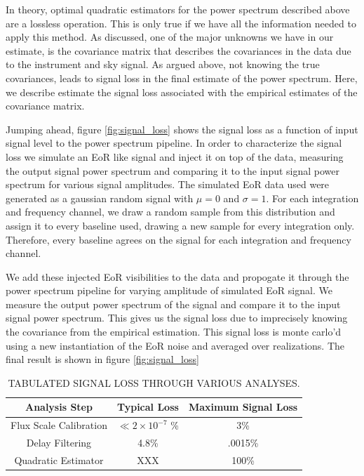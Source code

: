 \documentclass[twocolumn,numberedappendix]{emulateapj} \shorttitle{PSA64}
\begin{document}
In theory, optimal quadratic estimators for the power spectrum described above are a
lossless operation. This is only true if we have all the information
needed to apply this method. As discussed, one of the major unknowns we have in our
estimate, is the covariance matrix that describes the covariances in the data
due to the instrument and sky signal. As argued above, not knowing the true
covariances, leads to signal loss in the final estimate of the power spectrum.
Here, we describe estimate the signal loss associated with the empirical
estimates of the covariance matrix.

Jumping ahead, figure \ref{fig:signal_loss} shows the signal loss as a function
of input signal level to the power spectrum pipeline. In order to characterize
the signal loss we simulate an EoR like signal and inject it on top of the data,
measuring the output signal power spectrum and comparing it to the input signal
power spectrum for various signal amplitudes. The simulated EoR data used were
generated as a gaussian random signal with $\mu=0$ and $\sigma=1$. For each
integration and frequency channel, we draw a random sample from this
distribution and assign it to every baseline used, drawing a new sample for
every integration only. Therefore, every baseline agrees on the signal for each
integration and frequency channel. 

We add these injected EoR visibilities to the data and propogate it through the
power spectrum pipeline for varying amplitude of simulated EoR signal. We
measure the output power spectrum of the signal and
compare it to the input signal power spectrum. This gives us the signal loss
due to imprecisely knowing the covariance from the empirical estimation. This
signal loss is monte carlo'd using a new instantiation of the EoR noise and
averaged over realizations. The final result is shown in figure
\ref{fig:signal_loss}

\begin{table}[htdp]
\caption{TABULATED SIGNAL LOSS THROUGH VARIOUS ANALYSES.}
\begin{center}
\begin{tabular}{|c|c|c|}\hline
Analysis Step & Typical Loss & Maximum Signal Loss \\ \hline \hline
Flux Scale Calibration &  $\ll 2 \times 10^{-7}$ \% & 3\% \\\hline
Delay Filtering & 4.8\% & .0015\% \\\hline
Quadratic Estimator & XXX & 100\% \\\hline
\end{tabular}
\end{center}
\label{tbl:sigloss}
\end{table}%
\end{document}
